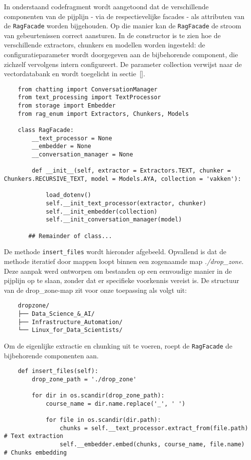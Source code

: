 In onderstaand codefragment wordt aangetoond dat de verschillende componenten van de pijplijn - via de respectievelijke facades - als attributen van de \texttt{RagFacade} worden bijgehouden. Op die manier kan de \texttt{RagFacade} de stroom van gebeurtenissen correct aansturen. In de constructor is te zien hoe de verschillende extractors, chunkers en modellen worden ingesteld: de configuratieparameter wordt doorgegeven aan de bijbehorende component, die zichzelf vervolgens intern configureert. De parameter collection verwijst naar de vectordatabank en wordt toegelicht in sectie~\ref{}.
    
\begin{verbatim}
    from chatting import ConversationManager
    from text_processing import TextProcessor
    from storage import Embedder
    from rag_enum import Extractors, Chunkers, Models
    
    class RagFacade:
        __text_processor = None 
        __embedder = None
        __conversation_manager = None 
    
        def __init__(self, extractor = Extractors.TEXT, chunker = Chunkers.RECURSIVE_TEXT, model = Models.AYA, collection = 'vakken'):

            load_dotenv() 
            self.__init_text_processor(extractor, chunker)
            self.__init_embedder(collection)
            self.__init_conversation_manager(model)
       
       ## Remainder of class...
\end{verbatim}

De methode \texttt{insert\_files} wordt hieronder afgebeeld. Opvallend is dat de methode iteratief door mappen loopt binnen een zogenaamde map \emph{./drop\_zone}. Deze aanpak werd ontworpen om bestanden op een eenvoudige manier in de pijplijn op te slaan, zonder dat er specifieke voorkennis vereist is. De structuur van de drop\_zone-map zit voor onze toepassing als volgt uit:

\begin{verbatim}
    dropzone/
    ├── Data_Science_&_AI/
    ├── Infrastructure_Automation/
    └── Linux_for_Data_Scientists/
\end{verbatim}

Om de eigenlijke extractie en chunking uit te voeren, roept de \texttt{RagFacade} de bijbehorende componenten aan.

\begin{verbatim}
    def insert_files(self):    
        drop_zone_path = './drop_zone'
        
        for dir in os.scandir(drop_zone_path):
            course_name = dir.name.replace('_', ' ')

            for file in os.scandir(dir.path):
                chunks = self.__text_processor.extract_from(file.path) # Text extraction
                self.__embedder.embed(chunks, course_name, file.name) # Chunks embedding
\end{verbatim}

